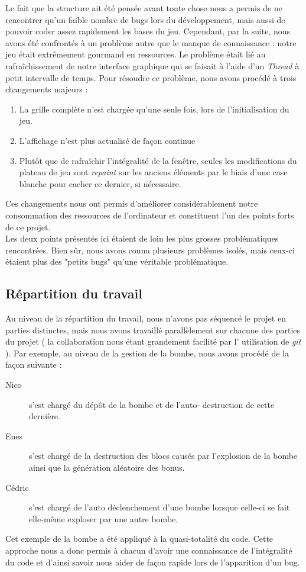 	Le fait que la structure ait été pensée avant toute chose nous
	a permis de ne rencontrer qu'un faible nombre de bugs lors du
	développement, mais aussi de pouvoir coder assez rapidement les bases
	du jeu. Cependant, par la suite, nous avons été confrontés à un problème
	autre que
	le manque de connaissance : notre jeu était extrêmement gourmand 
	en ressources. Le problème était lié au 
	rafraîchissement de notre interface graphique qui se faisait à l'aide d'un
	\textit{Thread} à petit intervalle de temps. Pour résoudre ce
	problème, nous avons procédé à trois changements
	majeurs :
	\begin{enumerate}
	\item La grille complète n'est chargée qu'une seule fois, lors 
	de l'initialisation du jeu. 
	\item L'affichage n'est plus actualisé de façon continue
	\item Plutôt que de rafraîchir l'intégralité de la fenêtre, 
	seules les modifications du plateau de jeu sont \textit{repaint} sur les anciens éléments par le biais d'une case blanche pour cacher ce dernier, si nécessaire.
	\end{enumerate}
	
	Ces changements nous ont permis d'améliorer considérablement notre
	consommation des ressources de l'ordinateur et constituent l'un des
	points forts de ce projet.\\
	Les deux points présentés ici étaient de loin les plus grosses
	problématiques rencontrées. Bien sûr, nous avons connu plusieurs
	problèmes isolés, mais ceux-ci étaient plus des "petits bugs" 
	qu'une véritable problématique. 
	
	\subsection{Répartition du travail}
	Au niveau de la répartition du travail, nous n'avons pas	séquencé le projet en parties distinctes, mais nous avons 
	travaillé parallèlement sur chacune des parties du projet (
	la collaboration nous étant grandement facilité par l'
	utilisation de \textit{git}	). Par exemple, au niveau de la 
	gestion de la bombe, nous avons procédé de la façon suivante :
	\begin{description}
	\item[Nico] s'est chargé du dépôt de la bombe et de l'auto-
	destruction de cette dernière.
	\item[Enes] s'est chargé de la destruction des blocs causés 
	par l’explosion de la bombe ainsi que la génération aléatoire
	des bonus.
	\item[Cédric] s'est chargé de l'auto déclenchement d'une bombe
	lorsque celle-ci se fait elle-même exploser par une autre 
	bombe.
	\end{description}
	
	Cet exemple de la bombe a été appliqué à la quasi-totalité du code. 
	Cette approche nous a donc permis à chacun d'avoir une connaissance 
	de l'intégralité du code et d'ainsi savoir nous aider de 
	façon rapide lors de l'apparition d'un bug.


